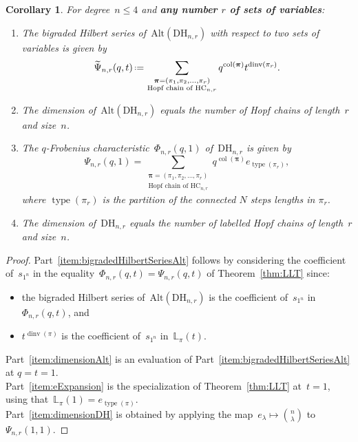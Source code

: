 \documentclass{amsart}
\newtheorem{corollary}[theorem]{Corollary}
\theoremstyle{definition}
\newcommand{\eqdef}{\mbox{\,\raisebox{0.2ex}{\scriptsize\ensuremath{\mathrm:}}\ensuremath{=}\,}} %
\newcommand{\DiagHarm}[2]{\mathrm{DH}_{#1,#2}} %
\newcommand{\dinv}{\operatorname{dinv}} %
\newcommand{\col}{\operatorname{col}} %
\newcommand{\type}{\operatorname{type}} %
\newcommand{\Alt}{\mathrm{Alt}} %
\newcommand{\HC}[2]{\mathrm{HC}_{#1,#2}} %
\newcommand{\bpi}{\boldsymbol \pi} %
\newcommand{\LLT}[2]{\mathbb{L}_{#1}(#2)} %
\begin{document}
\begin{corollary}
\label{coro:bigcoro}
For degree~$n \le 4$ and \textbf{any number $r$ of sets of variables}:
\begin{enumerate}
\item \label{item:bigradedHilbertSeriesAlt}
The bigraded Hilbert series of~$\Alt(\DiagHarm{n}{r})$ with respect to two sets of variables is given by
\[
\widetilde\Psi_{n,r}(q,t) \eqdef \sum_{\substack{\bpi=(\pi_1,\pi_2,\dots ,\pi_r) \\ \text{Hopf chain of } \HC{n}{r}}}  q^{\col(\bpi)} t^{\dinv(\pi_r)}.
\]

\item \label{item:dimensionAlt}
The dimension of~$\Alt(\DiagHarm{n}{r})$ equals the number of Hopf chains of length~$r$ and size~$n$. 

\item \label{item:eExpansion}
The $q$-Frobenius characteristic~$\Phi_{n,r}(q,1)$ of~$\DiagHarm{n}{r}$ is given by
\[
\Psi_{n,r}(q,1) = \sum_{\substack{\bpi=(\pi_1,\pi_2,\dots ,\pi_r) \\ \text{Hopf chain of } \HC{n}{r}}}  q^{\col(\bpi)} e_{\type(\pi_r)},
\]
where $\type(\pi_r)$ is the partition of the connected $N$ steps lengths in $\pi_r$.

\item \label{item:dimensionDH}
The dimension of~$\DiagHarm{n}{r}$ equals the number of labelled Hopf chains of length~$r$ and size~$n$. 
\end{enumerate}
\end{corollary}

\begin{proof}
Part~\eqref{item:bigradedHilbertSeriesAlt} follows by considering the coefficient of~$s_{1^n}$ in the equality~$\Phi_{n,r}(q,t) = \Psi_{n,r}(q,t)$ of Theorem~\ref{thm:LLT} since:
\begin{itemize}
\item the bigraded Hilbert series of~$\Alt(\DiagHarm{n}{r})$ is the coefficient of~$s_{1^n}$ in~$\Phi_{n,r}(q,t)$, and
\item $t^{\dinv(\pi)}$ is the coefficient of~$s_{1^n}$ in~$\LLT{\pi}{t}$.
\end{itemize}
Part~\eqref{item:dimensionAlt} is an evaluation of Part~\eqref{item:bigradedHilbertSeriesAlt} at $q = t = 1$. \\
Part~\eqref{item:eExpansion} is the specialization of Theorem~\ref{thm:LLT} at~$t = 1$, using that~$\LLT{\pi}{1} = e_{\type(\pi)}$. \\
Part~\eqref{item:dimensionDH} is obtained by applying the map~$e_\lambda\mapsto {n\choose \lambda}$ to~$\Psi_{n,r}(1,1)$.
\end{proof}
\end{document}
